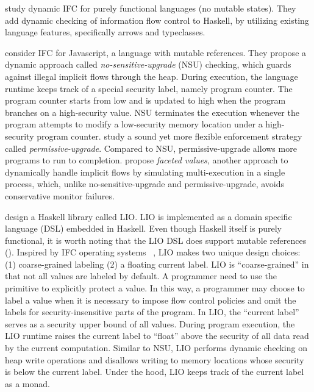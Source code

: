 \textcite{li2006encoding,LI20101974} study dynamic IFC for purely functional
languages (no mutable states). They add dynamic checking of information flow
control to Haskell, by utilizing existing language features, specifically arrows
and typeclasses.

\textcite{austin2009efficient} consider IFC for Javascript, a language with
mutable references. They propose a dynamic approach called
\textit{no-sensitive-upgrade} (NSU) checking, which guards against illegal
implicit flows through the heap. During execution, the language runtime keeps
track of a special security label, namely program counter. The program counter
starts from low and is updated to high when the program branches on a
high-security value. NSU terminates the execution whenever the program attempts
to modify a low-security memory location under a high-security program counter.
\textcite{austin2010permissive} study a sound yet more flexible enforcement
strategy called \textit{permissive-upgrade}. Compared to NSU, permissive-upgrade
allows more programs to run to completion.
\textcite{austin2012multiple,Austin:2017uh} propose \textit{faceted values},
another approach to dynamically handle implicit flows by simulating
multi-execution in a single process, which, unlike no-sensitive-upgrade and
permissive-upgrade, avoids conservative monitor failures.

\textcite{stefan2011flexible,stefan2012flexible,STEFAN:2017ta} design a Haskell
library called LIO. LIO is implemented as a domain specific language (DSL)
embedded in Haskell. Even though Haskell itself is purely functional, it is
worth noting that the LIO DSL does support mutable references ().
Inspired by IFC operating systems
~\parencite{efstathopoulos2005labels,zeldovich2011making,krohn2007information,vandebogart2007labels},
LIO makes two unique design choices: (1) coarse-grained labeling (2) a floating
current label. LIO is ``coarse-grained'' in that not all values are labeled by
default. A programmer need to use the  primitive to explicitly
protect a value. In this way, a programmer may choose to label a value when it
is necessary to impose flow control policies and omit the labels for
security-insensitive parts of the program. In LIO, the ``current label'' serves
as a security upper bound of all values. During program execution, the LIO
runtime raises the current label to ``float'' above the security of all data
read by the current computation. Similar to NSU, LIO performs dynamic checking
on heap write operations and disallows writing to memory locations whose
security is below the current label. Under the hood, LIO keeps track of the
current label as a monad.

